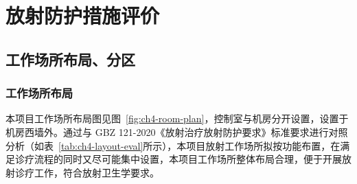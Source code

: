 \chapter{放射防护措施评价}

\section{工作场所布局、分区}

\subsection{工作场所布局}

本项目工作场所布局图见图~\ref{fig:ch4-room-plan}，控制室与机房分开设置，设置于机房西墙外。通过与 GBZ 121-2020《放射治疗放射防护要求》标准要求进行对照分析（如表~\ref{tab:ch4-layout-eval}所示），本项目放射工作场所拟按功能布置，在满足诊疗流程的同时又尽可能集中设置，本项目工作场所整体布局合理，便于开展放射诊疗工作，符合放射卫生学要求。



